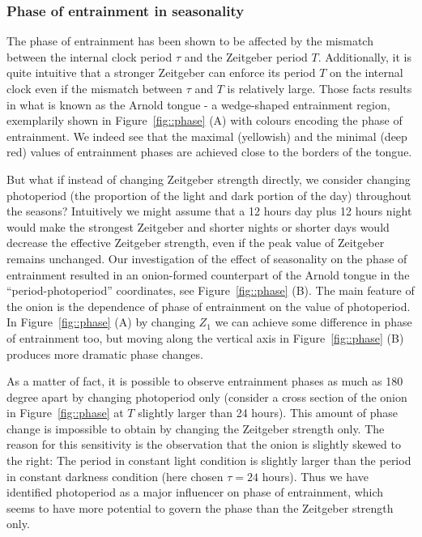 \subsubsection{Phase of entrainment in seasonality}
The phase of entrainment has been shown to be affected by the mismatch
between the internal clock period $\tau$ and the Zeitgeber period $T$.
Additionally, it is quite intuitive that a stronger Zeitgeber can
enforce its period $T$ on the internal clock even if the mismatch
between $\tau$ and $T$ is relatively large. Those facts results in
what is known as the Arnold tongue - a wedge-shaped entrainment
region, exemplarily shown in Figure~\ref{fig::phase} (A) with colours
encoding the phase of entrainment. We indeed see that the maximal
(yellowish) and the minimal (deep red) values of entrainment phases
are achieved close to the borders of the tongue.

But what if instead of changing Zeitgeber strength directly, we
consider changing photoperiod (the proportion of the light and dark
portion of the day) throughout the seasons? Intuitively we might
assume that a 12 hours day plus 12 hours night would make the
strongest Zeitgeber and shorter nights or shorter days would decrease
the effective Zeitgeber strength, even if the peak value of Zeitgeber
remains unchanged. Our investigation of the effect of seasonality on
the phase of entrainment resulted in an onion-formed counterpart of
the Arnold tongue in the ``period-photoperiod'' coordinates, see
Figure~\ref{fig::phase} (B). The main feature of the onion is the
dependence of phase of entrainment on the value of photoperiod. In
Figure~\ref{fig::phase} (A) by changing $Z_1$ we can achieve some
difference in phase of entrainment too, but moving along the vertical
axis in Figure~\ref{fig::phase} (B) produces more dramatic phase
changes.

As a matter of fact, it is possible to observe entrainment phases as
much as 180 degree apart by changing photoperiod only (consider a
cross section of the onion in Figure~\ref{fig::phase} at $T$ slightly
larger than 24 hours). This amount of phase change is impossible to
obtain by changing the Zeitgeber strength only. The reason for this
sensitivity is the observation that the onion is slightly skewed to
the right: The period in constant light condition is slightly larger
than the period in constant darkness condition (here chosen $\tau =
24$ hours). Thus we have identified photoperiod as a major influencer
on phase of entrainment, which seems to have more potential to govern
the phase than the Zeitgeber strength only.

